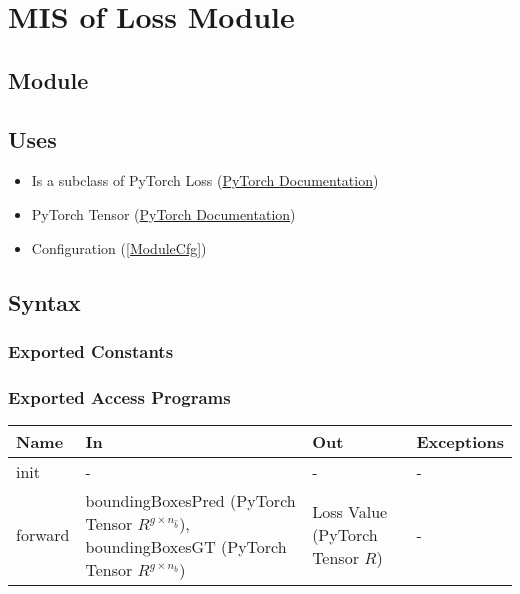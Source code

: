 \documentclass[12pt, titlepage]{article}
\begin{document}
\newpage

\section{MIS of Loss Module} \label{ModuleLoss} 

\subsection{Module}



\subsection{Uses}

\begin{itemize}
  \item Is a subclass of PyTorch Loss (\href{https://pytorch.org/docs/stable/nn.html#loss-functions}{PyTorch Documentation})
  \item PyTorch Tensor (\href{https://pytorch.org/docs/stable/tensors.html}{PyTorch Documentation})
  \item Configuration (\ref{ModuleCfg})
\end{itemize}

\subsection{Syntax}



\subsubsection{Exported Constants}



\subsubsection{Exported Access Programs}

\begin{center}
\begin{tabular}{p{2cm}|p{6cm}|p{4cm}|p{2cm}}
\hline
\textbf{Name} & \textbf{In} & \textbf{Out} & \textbf{Exceptions} \\
\hline
init & - & - & - \\
\hline
forward & boundingBoxesPred (PyTorch Tensor $R^{g\times{}n_{\hat{b}}}$), boundingBoxesGT (PyTorch Tensor $R^{g\times{}n_{b}}$) & Loss Value (PyTorch Tensor $R$) & - \\
\hline
\end{tabular}
\end{center}
\end{document}
